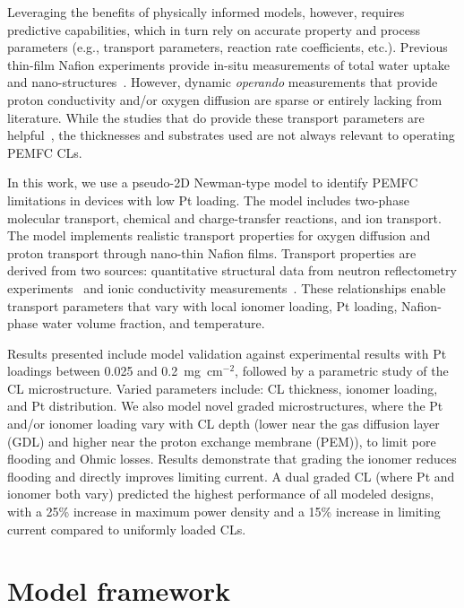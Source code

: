\documentclass[final,3p,times,twocolumn]{elsarticle}    %
\begin{document}
Leveraging the benefits of physically informed models, however, requires predictive capabilities, which in turn rely on accurate property and process parameters (e.g., transport parameters, reaction rate coefficients, etc.). Previous thin-film Nafion experiments provide in-situ measurements of total water uptake~\cite{bib:kongkanand_2011, bib:bharath_2016, bib:dura_2009, bib:decaluwe_2018} and nano-structures~\cite{bib:dura_2009, bib:decaluwe_2018, bib:wood_2009, bib:peltonen_2021}. However, dynamic \emph{operando} measurements that provide proton conductivity and/or oxygen diffusion are sparse or entirely lacking from literature. While the studies that do provide these transport parameters are helpful~\cite{bib:chen_2019, bib:paul_mccreery_2014}, the thicknesses and substrates used are not always relevant to operating PEMFC CLs. 

In this work, we use a pseudo-2D Newman-type model to identify PEMFC limitations in devices with low Pt loading. The model includes two-phase molecular transport, chemical and charge-transfer reactions, and ion transport. The model implements realistic transport properties for oxygen diffusion and proton transport through nano-thin Nafion films. Transport properties are derived from two sources: quantitative structural data from neutron reflectometry experiments~\cite{bib:decaluwe_2018} and ionic conductivity measurements~\cite{bib:paul_mccreery_2014}. These relationships enable transport parameters that vary with local ionomer loading, Pt loading, Nafion-phase water volume fraction, and temperature. 

Results presented include model validation against experimental results with Pt loadings between 0.025 and 0.2~mg~cm$^{-2}$, followed by a parametric study of the CL microstructure. Varied parameters include: CL thickness, ionomer loading, and Pt distribution. We also model novel graded microstructures, where the Pt and/or ionomer loading vary with CL depth (lower near the gas diffusion layer (GDL) and higher near the proton exchange membrane (PEM)), to limit pore flooding and Ohmic losses. Results demonstrate that grading the ionomer reduces flooding and directly improves limiting current. A dual graded CL (where Pt and ionomer both vary) predicted the highest performance of all modeled designs, with a 25\% increase in maximum power density and a 15\% increase in limiting current compared to uniformly loaded CLs.


\section{Model framework}
\label{sect:model-framework}
\end{document}
